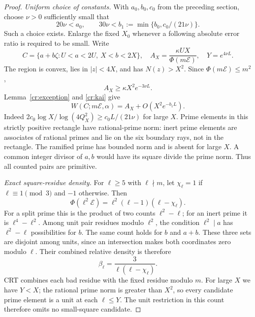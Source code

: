 \begin{proof}
\emph{Uniform choice of constants.} With $a_0,b_0,c_0$ from the preceding
section, choose $\nu>0$ sufficiently small that
\[
 20\nu<a_0,\qquad
 30\nu<b_1:=\min\{b_0,c_0/(21\nu)\}.
\]
Such a choice exists. Enlarge the fixed $X_0$ whenever a following absolute
error ratio is required to be small. Write
\[
 C=\{a+b\zeta:U<a<2U,\ X<b<2X\},\quad
 A_X=\frac{\kappa UX}{\Phi(m\mathcal E)},\quad Y=e^{4\nu L}.
\]
The region is convex, lies in $|z|<4X$, and has $N(z)>X^2$. Since
$\Phi(m\mathcal E)\le m^2$,
\begin{equation}\label{cr:mainfloor}
 A_X\ge\kappa X^2e^{-3\nu L}.
\end{equation}
Lemma~\ref{cr:exception} and \eqref{cr:kai} give
\begin{equation}\label{cr:basecount}
 W(C;m\mathcal E,\alpha)=A_X+O(X^2e^{-b_1L}).
\end{equation}
Indeed $2c_0\log X/\log(4Q_X^2)\ge c_0L/(21\nu)$ for large $X$.
Prime elements in this strictly positive rectangle have rational-prime norm:
inert prime elements are associates of rational primes and lie on the six
boundary rays, not in the rectangle. The ramified prime has bounded norm and
is absent for large $X$. A common integer divisor of $a,b$ would have its
square divide the prime norm. Thus all counted pairs are primitive.

\emph{Exact square-residue density.} For $\ell\ge5$ with $\ell\nmid m$, let
$\chi_\ell=1$ if $\ell\equiv1\pmod3$ and $-1$ otherwise. Then
\[
 \Phi(\ell^2\mathcal E)=\ell^2(\ell-1)(\ell-\chi_\ell).
\]
For a split prime this is the product of two counts $\ell^2-\ell$; for an
inert prime it is $\ell^4-\ell^2$. Among unit pair residues modulo $\ell^2$,
the condition $\ell^2\mid a$ has $\ell^2-\ell$ possibilities for $b$.
The same count holds for $b$ and $a+b$. These three sets are disjoint among
units, since an intersection makes both coordinates zero modulo $\ell$.
Their combined relative density is therefore
\begin{equation}\label{cr:beta}
 \beta_\ell=\frac3{\ell(\ell-\chi_\ell)}.
\end{equation}
CRT combines each bad residue with the fixed residue modulo $m$. For large
$X$ we have $Y<X$; the rational prime norm is greater than $X^2$, so
every candidate prime element is a unit at each $\ell\le Y$. The unit
restriction in this count therefore omits no small-square candidate.


\end{proof}
